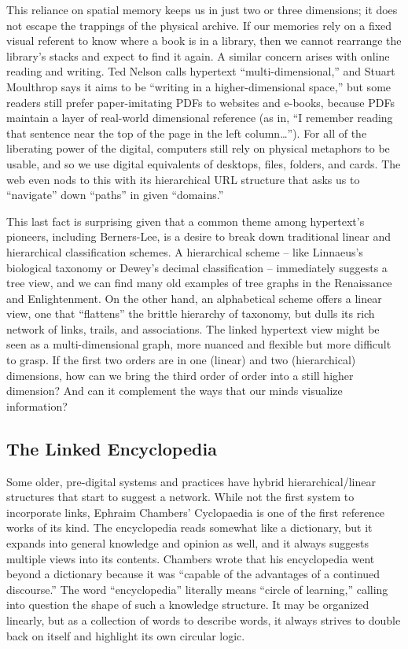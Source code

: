 This reliance on spatial memory keeps us in just two or three dimensions; it does not escape the trappings of the physical archive. If our memories rely on a fixed visual referent to know where a book is in a library, then we cannot rearrange the library’s stacks and expect to find it again. A similar concern arises with online reading and writing. Ted Nelson calls hypertext “multi-dimensional,” and Stuart Moulthrop says it aims to be “writing in a higher-dimensional space,”  but some readers still prefer paper-imitating PDFs to websites and e-books, because PDFs maintain a layer of real-world dimensional reference (as in, “I remember reading that sentence near the top of the page in the left column…”). For all of the liberating power of the digital, computers still rely on physical metaphors to be usable, and so we use digital equivalents of desktops, files, folders, and cards. The web even nods to this with its hierarchical URL structure that asks us to “navigate” down “paths” in given “domains.”

This last fact is surprising given that a common theme among hypertext’s pioneers, including Berners-Lee, is a desire to break down traditional linear and hierarchical classification schemes. A hierarchical scheme – like Linnaeus’s biological taxonomy or Dewey’s decimal classification – immediately suggests a tree view, and we can find many old examples of tree graphs in the Renaissance and Enlightenment.  On the other hand, an alphabetical scheme offers a linear view, one that “flattens” the brittle hierarchy of taxonomy, but dulls its rich network of links, trails, and associations. The linked hypertext view might be seen as a multi-dimensional graph, more nuanced and flexible but more difficult to grasp. If the first two orders are in one (linear) and two (hierarchical) dimensions, how can we bring the third order of order into a still higher dimension? And can it complement the ways that our minds visualize information?

\subsection{The Linked Encyclopedia}

Some older, pre-digital systems and practices have hybrid hierarchical/linear structures that start to suggest a network. While not the first system to incorporate links, Ephraim Chambers’ Cyclopaedia is one of the first reference works of its kind. The encyclopedia reads somewhat like a dictionary, but it expands into general knowledge and opinion as well, and it always suggests multiple views into its contents. Chambers wrote that his encyclopedia went beyond a dictionary because it was “capable of the advantages of a continued discourse.”  The word “encyclopedia” literally means “circle of learning,” calling into question the shape of such a knowledge structure. It may be organized linearly, but as a collection of words to describe words, it always strives to double back on itself and highlight its own circular logic.

